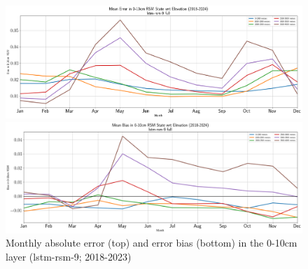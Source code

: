 \begin{figure}[h!]
    \centering
    \includegraphics[width=.99\linewidth,draft=false]{figures/grid-eval_qtrly/eval-grid_full_lstm-rsm-9_pixelwise-time-stats_monthly-elev-abs-err-state-rsm-10.png}

    \includegraphics[width=.99\linewidth,draft=false]{figures/grid-eval_qtrly/eval-grid_full_lstm-rsm-9_pixelwise-time-stats_monthly-elev-bias-state-rsm-10.png}

    \caption{Monthly absolute error (top) and error bias (bottom) in the 0-10cm layer (lstm-rsm-9; 2018-2023)}
    \label{bulk-eval_monthly-elev-err_0-10cm}
\end{figure}


